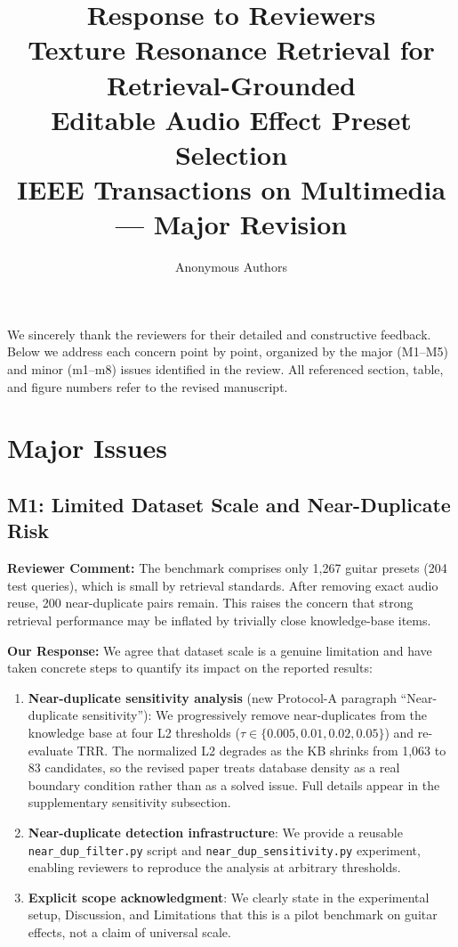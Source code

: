 \documentclass[11pt]{article}
\title{Response to Reviewers\\
\large Texture Resonance Retrieval for Retrieval-Grounded\\Editable Audio Effect Preset Selection\\
\large IEEE Transactions on Multimedia --- Major Revision}
\author{Anonymous Authors}
\date{}
\newcommand{\reviewer}[1]{\textcolor{reviewercolor}{\textbf{Reviewer Comment:} #1}}
\newcommand{\response}[1]{\textcolor{responsecolor}{\textbf{Our Response:} #1}}
\begin{document}
\sloppy
\maketitle

We sincerely thank the reviewers for their detailed and constructive feedback. Below we address each concern point by point, organized by the major (M1--M5) and minor (m1--m8) issues identified in the review. All referenced section, table, and figure numbers refer to the revised manuscript.

\section*{Major Issues}

\subsection*{M1: Limited Dataset Scale and Near-Duplicate Risk}

\reviewer{The benchmark comprises only 1,267 guitar presets (204 test queries), which is small by retrieval standards. After removing exact audio reuse, 200 near-duplicate pairs remain. This raises the concern that strong retrieval performance may be inflated by trivially close knowledge-base items.}

\response{We agree that dataset scale is a genuine limitation and have taken concrete steps to quantify its impact on the reported results:}

\begin{enumerate}[leftmargin=*]
\item \textbf{Near-duplicate sensitivity analysis} (new Protocol-A paragraph ``Near-duplicate sensitivity''): We progressively remove near-duplicates from the knowledge base at four L2 thresholds ($\tau \in \{0.005, 0.01, 0.02, 0.05\}$) and re-evaluate TRR. The normalized L2 degrades as the KB shrinks from 1,063 to 83 candidates, so the revised paper treats database density as a real boundary condition rather than as a solved issue. Full details appear in the supplementary sensitivity subsection.
\item \textbf{Near-duplicate detection infrastructure}: We provide a reusable \texttt{near\_dup\_filter.py} script and \texttt{near\_dup\_sensitivity.py} experiment, enabling reviewers to reproduce the analysis at arbitrary thresholds.
\item \textbf{Explicit scope acknowledgment}: We clearly state in the experimental setup, Discussion, and Limitations that this is a pilot benchmark on guitar effects, not a claim of universal scale.
\end{enumerate}
\end{document}
